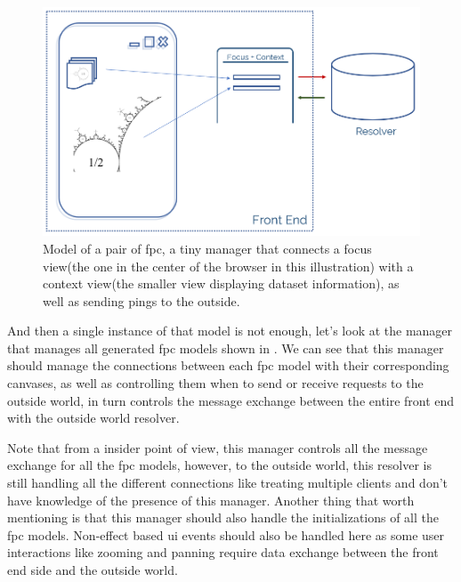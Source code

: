 \begin{figure}[H]
\centering
\includegraphics[width=\textwidth,keepaspectratio]{Figures/Chapter3/fpcpair.png}
\decoRule
\caption[A Pair of Focus + Context]{Model of a pair of \gls{fpc}, a tiny manager that connects a focus view(the one in the center of the browser in this illustration) with a context view(the smaller view displaying dataset information), as well as sending pings to the outside.}
\label{fig:fpcpair}
\end{figure}

And then a single instance of that model is not enough, let's look at the manager that manages all generated \gls{fpc} models shown in . We can see that this manager should manage the connections between each \gls{fpc} model with their corresponding canvases, as well as controlling them when to send or receive requests to the outside world, in turn controls the message exchange between the entire front end with the outside world resolver.

Note that from a insider point of view, this manager controls all the message exchange for all the \gls{fpc} models, however, to the outside world, this resolver is still handling all the different connections like treating multiple clients and don't have knowledge of the presence of this manager. Another thing that worth mentioning is that this manager should also handle the initializations of all the \gls{fpc} models. Non-effect based \gls{ui} events should also be handled here as some user interactions like zooming and panning require data exchange between the front end side and the outside world.

